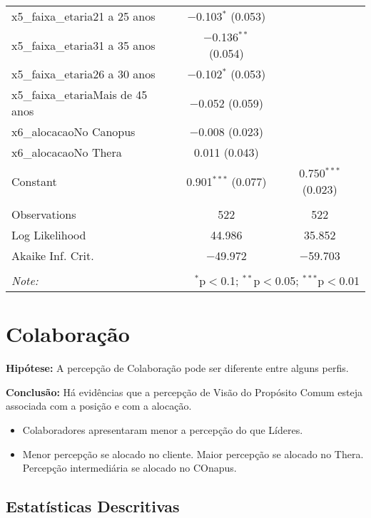\documentclass[]{book}
\providecommand{\tightlist}{%
  \setlength{\itemsep}{0pt}\setlength{\parskip}{0pt}}
\begin{document}
\begin{table}[!htbp]
\begin{tabular}{@{\extracolsep{5pt}}lcc}
  x5\_faixa\_etaria21 a 25 anos & $-$0.103$^{*}$ (0.053) &  \\ 
  x5\_faixa\_etaria31 a 35 anos & $-$0.136$^{**}$ (0.054) &  \\ 
  x5\_faixa\_etaria26 a 30 anos & $-$0.102$^{*}$ (0.053) &  \\ 
  x5\_faixa\_etariaMais de 45 anos & $-$0.052 (0.059) &  \\ 
  x6\_alocacaoNo Canopus & $-$0.008 (0.023) &  \\ 
  x6\_alocacaoNo Thera & 0.011 (0.043) &  \\ 
  Constant & 0.901$^{***}$ (0.077) & 0.750$^{***}$ (0.023) \\ 
 \hline \\[-1.8ex] 
Observations & 522 & 522 \\ 
Log Likelihood & 44.986 & 35.852 \\ 
Akaike Inf. Crit. & $-$49.972 & $-$59.703 \\ 
\hline 
\hline \\[-1.8ex] 
\textit{Note:}  & \multicolumn{2}{r}{$^{*}$p$<$0.1; $^{**}$p$<$0.05; $^{***}$p$<$0.01} \\ 
\end{tabular} 
\end{table}

\pagebreak

\hypertarget{colaboracao-1}{%
\section{Colaboração}\label{colaboracao-1}}

\textbf{Hipótese:} A percepção de Colaboração pode ser diferente entre alguns perfis.

\textbf{Conclusão:} Há evidências que a percepção de Visão do Propósito Comum esteja associada com a posição e com a alocação.

\begin{itemize}
\tightlist
\item
  Colaboradores apresentaram menor a percepção do que Líderes.
\item
  Menor percepção se alocado no cliente. Maior percepção se alocado no Thera. Percepção intermediária se alocado no COnapus.
\end{itemize}

\hypertarget{estatisticas-descritivas-10}{%
\subsection{Estatísticas Descritivas}\label{estatisticas-descritivas-10}}
\end{document}
